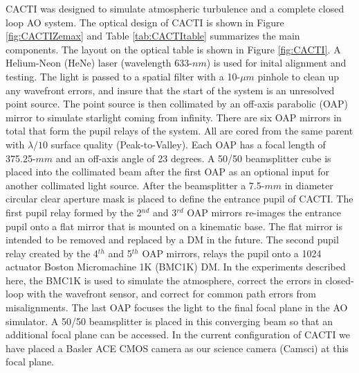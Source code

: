 CACTI was designed to simulate atmospheric turbulence and a complete closed loop AO system. The optical design of  CACTI  is shown in Figure \ref{fig:CACTIZemax} and Table \ref{tab:CACTItable} summarizes the main components. The layout on the optical table is shown in Figure \ref{fig:CACTI}. A Helium-Neon (HeNe) laser (wavelength 633-$nm$) is used for inital alignment and testing.  The light is passed to a spatial filter with a 10-$\mu m$ pinhole to clean up any wavefront errors, and insure that the start of the system is an unresolved point source. The point source is then collimated by an off-axis parabolic (OAP) mirror to simulate starlight coming from infinity. There are six OAP mirrors in total that form the pupil relays of the system. All are cored from the same parent with $\lambda /10$ surface quality (Peak-to-Valley). Each OAP has a focal length of 375.25-$mm$ and an off-axis angle of 23 degrees. A 50/50 beamsplitter cube is placed into the collimated beam after the first OAP as an optional input for another collimated light source. After the beamsplitter a 7.5-$mm$ in diameter circular clear aperture mask is placed to define the entrance pupil of CACTI. The first pupil relay formed by the 2$^{nd}$ and 3$^{rd}$ OAP mirrors re-images the entrance pupil onto a flat mirror that is mounted on a kinematic base. The flat mirror is intended to be removed and replaced by a DM in the future. The second pupil relay created by the 4$^{th}$ and 5$^{th}$ OAP mirrors, relays the pupil onto a 1024 actuator Boston Micromachine 1K (BMC1K) DM. In the experiments described here, the BMC1K is used to simulate the atmosphere, correct the errors in closed-loop with the wavefront sensor, and correct for common path errors from misalignments. The last OAP focuses the light to the final focal plane in the AO simulator. A 50/50 beamsplitter is placed in this converging beam so that an additional focal plane can be accessed. In the current configuration of CACTI we have placed a Basler ACE CMOS camera as our science camera (Camsci) at this focal plane.


